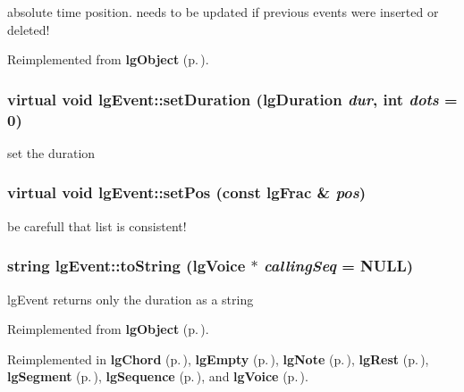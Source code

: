 absolute time position. needs to be updated if previous events were inserted or deleted! 



Reimplemented from {\bf lg\-Object} {\rm (p.\,\pageref{classlgObject_a5})}.
\subsubsection{\setlength{\rightskip}{0pt plus 5cm}virtual void lg\-Event::set\-Duration ({\bf lg\-Duration} {\em dur}, int {\em dots} = 0)\hspace{0.3cm}{\tt  [inline, virtual]}}\label{classlgEvent_a5}


set the duration 

\subsubsection{\setlength{\rightskip}{0pt plus 5cm}virtual void lg\-Event::set\-Pos (const lg\-Frac \& {\em pos})\hspace{0.3cm}{\tt  [inline, virtual]}}\label{classlgEvent_a7}


be carefull that list is consistent! 

\subsubsection{\setlength{\rightskip}{0pt plus 5cm}string lg\-Event::to\-String ({\bf lg\-Voice} $\ast$ {\em calling\-Seq} = NULL)\hspace{0.3cm}{\tt  [virtual]}}\label{classlgEvent_a1}


lg\-Event returns only the duration as a string 



Reimplemented from {\bf lg\-Object} {\rm (p.\,\pageref{classlgObject_a3})}.

Reimplemented in {\bf lg\-Chord} {\rm (p.\,\pageref{classlgChord_a6})}, {\bf lg\-Empty} {\rm (p.\,\pageref{classlgEmpty_a0})}, {\bf lg\-Note} {\rm (p.\,\pageref{classlgNote_a0})}, {\bf lg\-Rest} {\rm (p.\,\pageref{classlgRest_a0})}, {\bf lg\-Segment} {\rm (p.\,\pageref{classlgSegment_a21})}, {\bf lg\-Sequence} {\rm (p.\,\pageref{classlgSequence_a0})}, and {\bf lg\-Voice} {\rm (p.\,\pageref{classlgVoice_a20})}.
